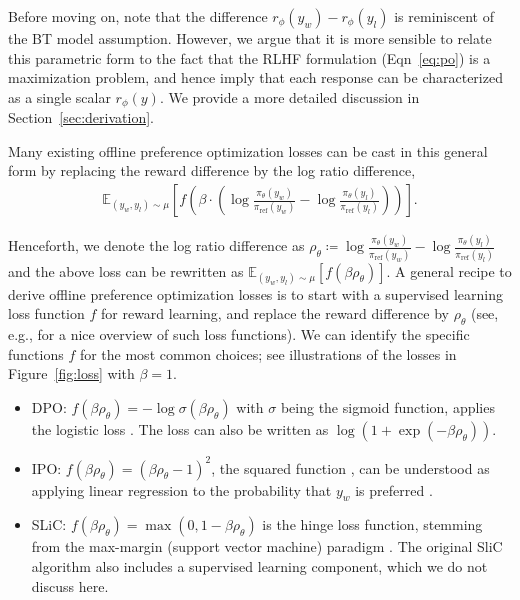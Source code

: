 Before moving on, note that the difference $r_\phi(y_w)-r_\phi(y_l)$ is reminiscent of the BT model assumption. However, we argue that it is more sensible to relate this parametric form to the fact that the RLHF formulation (Eqn~\ref{eq:po}) is a maximization problem, and hence imply that each response can be characterized as a single scalar $r_\phi(y)$.  We provide a more detailed discussion in Section~\ref{sec:derivation}.

Many existing offline preference optimization losses can be cast in this general form by replacing the reward difference by the log ratio difference,
\begin{align}
\mathbb{E}_{(y_w,y_l)\sim \mu}\left[f\left(\beta\cdot\left(\log\frac{\pi_\theta(y_w)}{\pi_\text{ref}(y_w)} - \log\frac{\pi_\theta(y_l)}{\pi_\text{ref}(y_l)}\right)\right)\right].\label{eq:offline-loss}
\end{align}

Henceforth, we denote the log ratio difference as $\rho_\theta\coloneqq \log\frac{\pi_\theta(y_w)}{\pi_\text{ref}(y_w)} - \log\frac{\pi_\theta(y_l)}{\pi_\text{ref}(y_l)}$ and the above loss can be rewritten as $\mathbb{E}_{(y_w,y_l)\sim\mu}\left[f\left(\beta\rho_\theta\right)\right]$. A general recipe to derive offline preference optimization losses is to start with a supervised learning loss function $f$ for reward learning, and replace the reward difference by $\rho_\theta$ (see, e.g., \citealp{hastie2009elements} for a nice overview of such loss functions). We can identify the specific functions $f$ for the most common choices; see illustrations of the losses in Figure~\ref{fig:loss} with $\beta=1$.
\begin{itemize}
    \item DPO: $f(\beta\rho_\theta) = -\log \sigma(\beta\rho_\theta)$ with $\sigma$ being the sigmoid function, applies the logistic loss \citep{hastie2009elements}. The loss can also be written as  $\log(1+\exp(-\beta\rho_\theta))$. 
    \item IPO: $f(\beta\rho_\theta) = \left(\beta\rho_\theta-1\right)^2$, the squared function \citep{rosasco2004loss}, can be understood as applying linear regression to the probability that $y_w$ is preferred \citep{hastie2009elements}.
    \item SLiC: $f(\beta\rho_\theta)=\max(0,1-\beta\rho_\theta)$ is the hinge loss function, stemming from the max-margin (support vector machine) paradigm \citep{boser1992training,cortes1995support}. The original SliC algorithm \citep{zhao2023SLiC} also includes a supervised learning component, which we do not discuss here.
\end{itemize}

